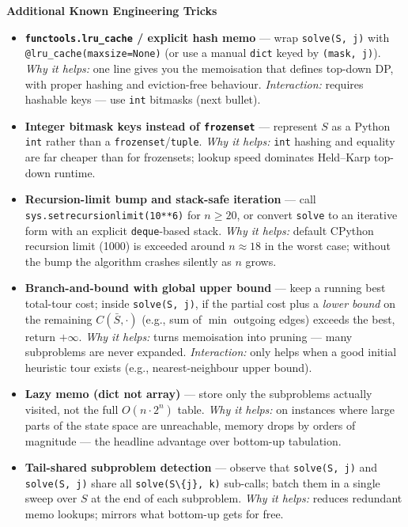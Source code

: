 \documentclass[11pt]{article}
\begin{document}
    \label{tricks-1-4}

    \textbf{Additional Known Engineering Tricks}

\begin{itemize}
\item
  \label{trick-1-4-1}\textbf{\texttt{functools.lru\_cache}
  / explicit hash memo} --- wrap \texttt{solve(S,\ j)} with
  \texttt{@lru\_cache(maxsize=None)} (or use a manual \texttt{dict}
  keyed by \texttt{(mask,\ j)}). \emph{Why it helps:} one line gives you
  the memoisation that defines top-down DP, with proper hashing and
  eviction-free behaviour. \emph{Interaction:} requires hashable keys
  --- use \texttt{int} bitmasks (next bullet).
\item
  \label{trick-1-4-2}\textbf{Integer bitmask keys instead
  of \texttt{frozenset}} --- represent \(S\) as a Python \texttt{int}
  rather than a \texttt{frozenset}/\texttt{tuple}. \emph{Why it helps:}
  \texttt{int} hashing and equality are far cheaper than for frozensets;
  lookup speed dominates Held--Karp top-down runtime.
\item
  \label{trick-1-4-3}\textbf{Recursion-limit bump and
  stack-safe iteration} --- call \texttt{sys.setrecursionlimit(10**6)}
  for \(n\!\geq\!20\), or convert \texttt{solve} to an iterative form
  with an explicit \texttt{deque}-based stack. \emph{Why it helps:}
  default CPython recursion limit (1000) is exceeded around
  \(n\approx 18\) in the worst case; without the bump the algorithm
  crashes silently as \(n\) grows.
\item
  \label{trick-1-4-4}\textbf{Branch-and-bound with global
  upper bound} --- keep a running best total-tour cost; inside
  \texttt{solve(S,\ j)}, if the partial cost plus a \emph{lower bound}
  on the remaining \(C(\bar S, \cdot)\) (e.g., sum of \(\min\) outgoing
  edges) exceeds the best, return \(+\infty\). \emph{Why it helps:}
  turns memoisation into pruning --- many subproblems are never
  expanded. \emph{Interaction:} only helps when a good initial heuristic
  tour exists (e.g., nearest-neighbour upper bound).
\item
  \label{trick-1-4-5}\textbf{Lazy memo (dict not array)}
  --- store only the subproblems actually visited, not the full
  \(O(n\cdot 2^n)\) table. \emph{Why it helps:} on instances where large
  parts of the state space are unreachable, memory drops by orders of
  magnitude --- the headline advantage over bottom-up tabulation.
\item
  \label{trick-1-4-6}\textbf{Tail-shared subproblem
  detection} --- observe that \texttt{solve(S,\ j)} and
  \texttt{solve(S,\ j\textquotesingle{})} share all
  \texttt{solve(S\textbackslash{}\{j\},\ k)} sub-calls; batch them in a
  single sweep over \(S\) at the end of each subproblem. \emph{Why it
  helps:} reduces redundant memo lookups; mirrors what bottom-up gets
  for free.
\end{itemize}
\end{document}
